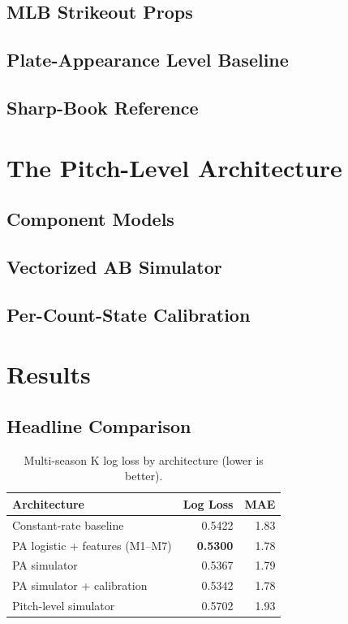 \documentclass[11pt]{article}
\begin{document}
\subsection{MLB Strikeout Props}
\subsection{Plate-Appearance Level Baseline}
\subsection{Sharp-Book Reference}

\section{The Pitch-Level Architecture}

\subsection{Component Models}
\subsection{Vectorized AB Simulator}
\subsection{Per-Count-State Calibration}

\section{Results}

\subsection{Headline Comparison}

\begin{table}[h]
\centering
\caption{Multi-season K log loss by architecture (lower is better).}
\begin{tabular}{lrr}
\toprule
Architecture & Log Loss & MAE \\
\midrule
Constant-rate baseline       & 0.5422 & 1.83 \\
PA logistic + features (M1--M7) & \textbf{0.5300} & 1.78 \\
PA simulator                  & 0.5367 & 1.79 \\
PA simulator + calibration    & 0.5342 & 1.78 \\
Pitch-level simulator         & 0.5702 & 1.93 \\
\bottomrule
\end{tabular}
\end{table}
\end{document}
